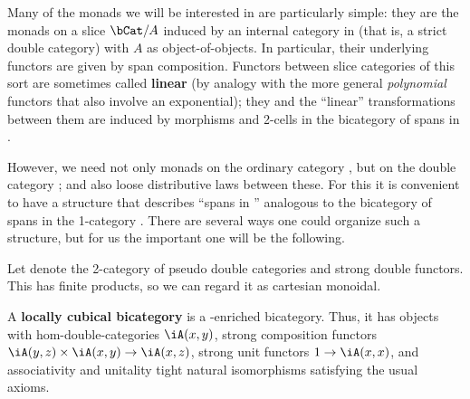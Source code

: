 \documentclass{amsart}
\begin{document}
Many of the monads we will be interested in are particularly simple: they are the monads on a slice $\bCat/A$ induced by an internal category in \bCat (that is, a strict double category) with $A$ as object-of-objects.
In particular, their underlying functors are given by span composition.
Functors between slice categories of this sort are sometimes called \textbf{linear} (by analogy with the more general \emph{polynomial} functors that also involve an exponential); they and the ``linear'' transformations between them are induced by morphisms and 2-cells in the bicategory of spans in \bCat.

However, we need not only monads on the ordinary category \bCat, but on the double category \dCat; and also loose distributive laws between these.
For this it is convenient to have a structure that describes ``spans in \dCat'' analogous to the bicategory of spans in the 1-category \bCat.
There are several ways one could organize such a structure, but for us the important one will be the following.

Let \cDbl denote the 2-category of pseudo double categories and strong double functors.
This has finite products, so we can regard it as cartesian monoidal.

\begin{defn}
  A \textbf{locally cubical bicategory} is a \cDbl-enriched bicategory.
  Thus, it has objects with hom-double-categories $\iA(x,y)$, strong composition functors $\iA(y,z)\times \iA(x,y) \to \iA(x,z)$, strong unit functors $1\to \iA(x,x)$, and associativity and unitality tight natural isomorphisms satisfying the usual axioms.
\end{defn}
\end{document}
